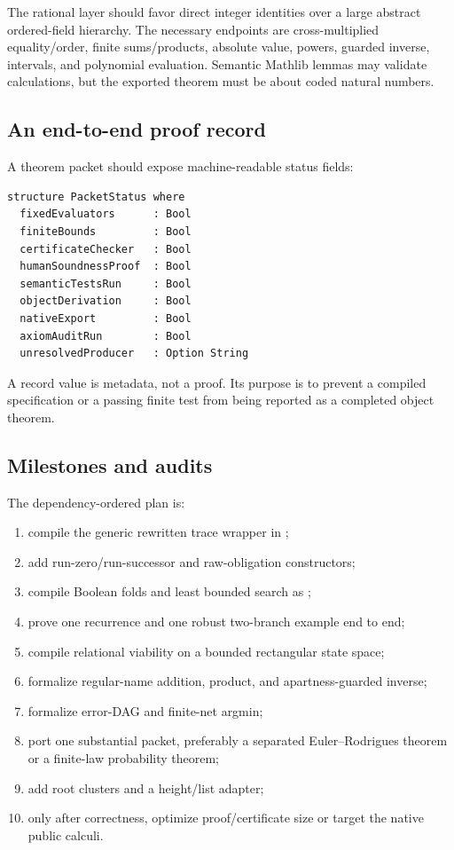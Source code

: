 The rational layer should favor direct integer identities over a large abstract ordered-field hierarchy.  The necessary endpoints are cross-multiplied equality/order, finite sums/products, absolute value, powers, guarded inverse, intervals, and polynomial evaluation.  Semantic Mathlib lemmas may validate calculations, but the exported theorem must be about coded natural numbers.

\subsection{An end-to-end proof record}

A theorem packet should expose machine-readable status fields:
\begin{lstlisting}
structure PacketStatus where
  fixedEvaluators      : Bool
  finiteBounds         : Bool
  certificateChecker   : Bool
  humanSoundnessProof  : Bool
  semanticTestsRun     : Bool
  objectDerivation     : Bool
  nativeExport         : Bool
  axiomAuditRun        : Bool
  unresolvedProducer   : Option String
\end{lstlisting}
A record value is metadata, not a proof.  Its purpose is to prevent a compiled specification or a passing finite test from being reported as a completed object theorem.

\subsection{Milestones and audits}

The dependency-ordered plan is:
\begin{enumerate}[label=\arabic*.]
\item compile the generic rewritten trace wrapper in ;
\item add run-zero/run-successor and raw-obligation constructors;
\item compile Boolean folds and least bounded search as ;
\item prove one recurrence and one robust two-branch example end to end;
\item compile relational viability on a bounded rectangular state space;
\item formalize regular-name addition, product, and apartness-guarded inverse;
\item formalize error-DAG and finite-net argmin;
\item port one substantial packet, preferably a separated Euler--Rodrigues theorem or a finite-law probability theorem;
\item add root clusters and a height/list adapter;
\item only after correctness, optimize proof/certificate size or target the native public calculi.
\end{enumerate}

